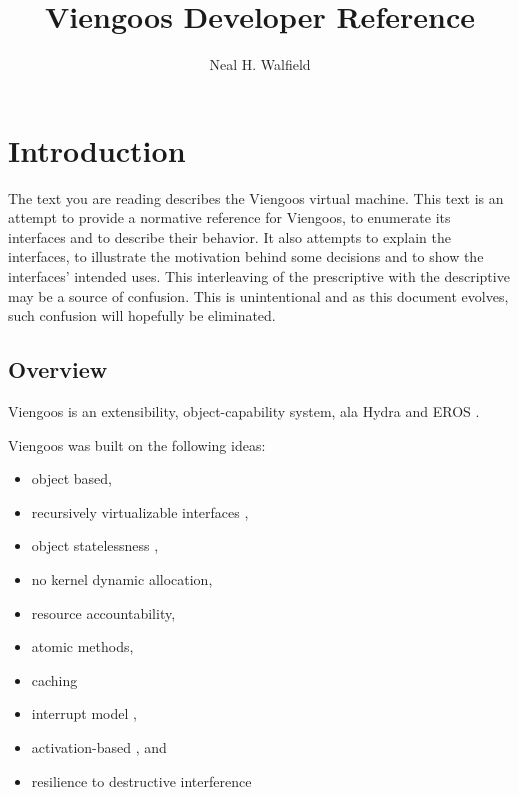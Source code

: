 \documentclass[12pt,a4paper]{book}
\title{Viengoos Developer Reference}
\author{Neal H. Walfield}
\begin{document}
\frontmatter
\maketitle
\tableofcontents

\mainmatter

\setlength{\parindent}{0pt}
\setlength{\parskip}{1ex plus 0.5ex minus 0.2ex}

\chapter{Introduction}

The text you are reading describes the Viengoos virtual machine.  This
text is an attempt to provide a normative reference for Viengoos, to
enumerate its interfaces and to describe their behavior.  It also
attempts to explain the interfaces, to illustrate the motivation
behind some decisions and to show the interfaces' intended uses.  This
interleaving of the prescriptive with the descriptive may be a source
of confusion.  This is unintentional and as this document evolves,
such confusion will hopefully be eliminated.

\section{Overview}

Viengoos is an extensibility, object-capability system, ala Hydra
\cite{wulf74hydra} and EROS \cite{shapiro99eros}.  

Viengoos was built on the following ideas:

\begin{itemize}
\item object based,
\item recursively virtualizable interfaces \cite{popek74requirements-for-virtualizable-architectures},
\item object statelessness \cite{tullmann96userlevel-checkpointing-through-exportable-kernel-state},
\item no kernel dynamic allocation,
\item resource accountability,
\item atomic methods,
\item caching \cite{cheriton94caching-model-of-os-kernel-functionality}
\item interrupt model \cite{ford99interface-and-execution-models},
\item activation-based \cite{roscoe95structure-of-a-multi-service-os}, and
\item resilience to destructive interference \cite{miller06robust-composition}
\end{itemize}
\end{document}
